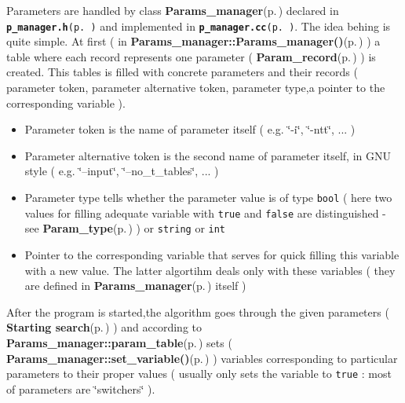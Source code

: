 Parameters are handled by class {\bf Params\_\-manager}{\rm (p.\,\pageref{classParams__manager})} declared in {\tt {\bf p\_\-manager.h}{\rm (p.\,\pageref{p__manager_8h})}} and implemented in {\tt {\bf p\_\-manager.cc}{\rm (p.\,\pageref{p__manager_8cc})}}. The idea behing is quite simple. At first ( in {\bf Params\_\-manager::Params\_\-manager()}{\rm (p.\,\pageref{classParams__manager_a0})} ) a table where each record represents one parameter ( {\bf Param\_\-record}{\rm (p.\,\pageref{structParam__record})} ) is created. This tables is filled with concrete parameters and their records ( parameter token, parameter alternative token, parameter type,a pointer to the corresponding variable ).\begin{itemize}
\item Parameter token is the name of parameter itself ( e.g. \char`\"{}-i\char`\"{}, \char`\"{}-ntt\char`\"{}, ... )\item Parameter alternative token is the second name of parameter itself, in GNU style ( e.g. \char`\"{}--input\char`\"{}, \char`\"{}--no\_\-t\_\-tables\char`\"{}, ... )\item Parameter type tells whether the parameter value is of type {\tt bool} ( here two values for filling adequate variable with {\tt true} and {\tt false} are distinguished - see {\bf Param\_\-type}{\rm (p.\,\pageref{p__manager_8h_a6})} ) or {\tt string} or {\tt int} \item Pointer to the corresponding variable that serves for quick filling this variable with a new value. The latter algortihm deals only with these variables ( they are defined in {\bf Params\_\-manager}{\rm (p.\,\pageref{classParams__manager})} itself )\end{itemize}


After the program is started,the algorithm goes through the given parameters ( {\bf Starting search}{\rm (p.\,\pageref{page_2})} ) and according to {\bf Params\_\-manager::param\_\-table}{\rm (p.\,\pageref{classParams__manager_r0})} sets ( {\bf Params\_\-manager::set\_\-variable()}{\rm (p.\,\pageref{classParams__manager_a23})} ) variables corresponding to particular parameters to their proper values ( usually only sets the variable to {\tt true} : most of parameters are \char`\"{}switchers\char`\"{} ). 